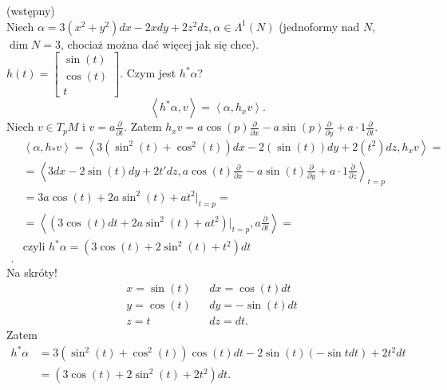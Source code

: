 \documentclass[../main.tex]{subfiles}
\begin{document}
    \begin{figure}[h]
        \centering
        \label{fig:fig_59}
    \end{figure}
    \begin{przyklad}
        (wstępny)\\
        Niech $\alpha = 3(x^2+y^2)dx - 2xdy + 2z^2dz, \alpha\in \Lambda^1(N)$ (jednoformy nad $N$, $\dim N = 3$, chociaż można dać więcej jak się chce).\\
        $h(t) = \begin{bmatrix} \sin(t)\\ \cos(t)\\ t \end{bmatrix} $. Czym jest $h^*\alpha$?\\
        \[
        \left<h^*\alpha,v \right> = \left<\alpha,h_xv \right>
        .\]
        Niech $v\in T_pM$ i  $v = a \frac{\partial }{\partial t} $. Zatem $h_x v = a \cos(p) \frac{\partial }{\partial x} - a \sin(p) \frac{\partial }{\partial y} + a\cdot 1 \frac{\partial }{\partial t} $.
        \begin{align*}
            &\left<\alpha,h_*v \right> = \left< 3 \left( \sin^2(t) + \cos^2(t)\right) dx - 2\left( \sin(t) \right) dy + 2\left( t^2 \right) dz, h_xv\right> =\\
            &= \left<3dx - 2\sin(t)dy + 2t'dz, a \cos(t) \frac{\partial }{\partial x} - a \sin(t) \frac{\partial }{\partial y} + a\cdot 1 \frac{\partial }{\partial z}  \right>_{t=p} \\
            &= 3a \cos(t) + 2a \sin^2(t) + at^2 \vert_{t=p} = \\
            &= \left< \left(3\cos(t)dt + 2a\sin^2(t) + at^2\right)\vert_{t=p}, a \frac{\partial }{\partial t}  \right> = \\
            & \text{czyli } h^*\alpha = \left( 3\cos(t) + 2 \sin^2(t) + t^2 \right) dt \\
        .\end{align*}
        Na skróty!\\
        \begin{align*}
            &x = \sin(t) &&dx = \cos(t)dt\\
            &y = \cos(t) &&dy = -\sin(t) dt\\
            &z = t &&dz = dt
        .\end{align*}
        Zatem
         \begin{align*}
             h^*\alpha &= 3\left( \sin^2(t) + \cos^2(t) \right) \cos(t)dt - 2\sin(t) \left( -\sin t dt \right) + 2t^2dt \\
                       &= \left( 3\cos(t) + 2\sin^2(t) + 2t^2 \right) dt
        .\end{align*}
    \end{przyklad}
\end{document}
